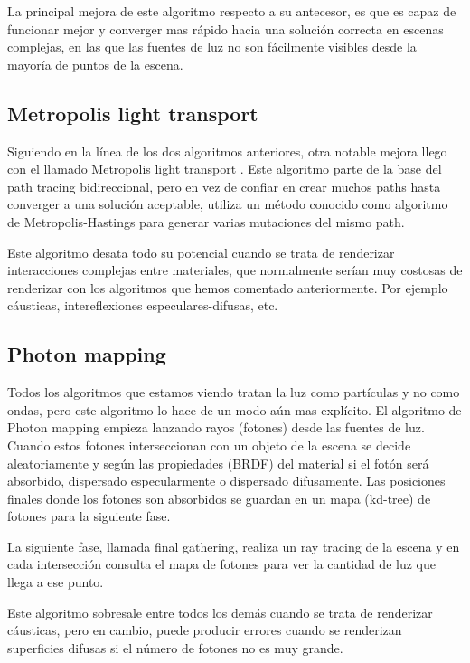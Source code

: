 \medskip
La principal mejora de este algoritmo respecto a su antecesor, es que es capaz de funcionar mejor y converger mas rápido hacia una solución correcta en escenas complejas, en las que las fuentes de luz no son fácilmente visibles desde la mayoría de puntos de la escena.

\subsection{Metropolis light transport}

Siguiendo en la línea de los dos algoritmos anteriores, otra notable mejora llego con el llamado Metropolis light transport \cite{Veach1997}. Este algoritmo parte de la base del path tracing bidireccional, pero en vez de confiar en crear muchos paths hasta converger a una solución aceptable, utiliza un método conocido como algoritmo de Metropolis-Hastings para generar varias mutaciones del mismo path. 

\medskip
Este algoritmo desata todo su potencial cuando se trata de renderizar interacciones complejas entre materiales, que normalmente serían muy costosas de renderizar con los algoritmos que hemos comentado anteriormente. Por ejemplo cáusticas, intereflexiones especulares-difusas, etc.

\clearpage

\subsection{Photon mapping}

Todos los algoritmos que estamos viendo tratan la luz como partículas y no como ondas, pero este algoritmo lo hace de un modo aún mas explícito.
El algoritmo de Photon mapping \cite{Jensen1996} empieza lanzando rayos (fotones) desde las fuentes de luz. Cuando estos fotones interseccionan con un objeto de la escena se decide aleatoriamente y según las propiedades (BRDF) del material si el fotón será absorbido, dispersado especularmente o dispersado difusamente. Las posiciones finales donde los fotones son absorbidos se guardan en un mapa (kd-tree) de fotones para la siguiente fase.

\medskip
La siguiente fase, llamada final gathering, realiza un ray tracing de la escena y en cada intersección consulta el mapa de fotones para ver la cantidad de luz que llega a ese punto.

\medskip
Este algoritmo sobresale entre todos los demás cuando se trata de renderizar cáusticas, pero en cambio, puede producir errores cuando se renderizan superficies difusas si el número de fotones no es muy grande.


